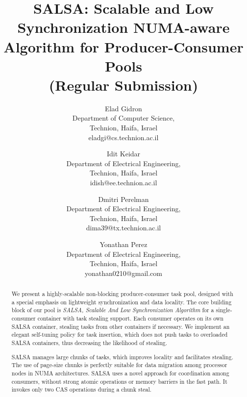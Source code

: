 \documentclass[11pt]{article}
\theoremstyle{plain}
\begin{document}
\begin{titlepage}

\title{SALSA: Scalable and Low Synchronization NUMA-aware Algorithm for Producer-Consumer Pools \\
       {\Large (Regular Submission)}}

\author{Elad Gidron \\
   Department of Computer Science,\\Technion, Haifa, Israel\\
   eladgi@cs.technion.ac.il \\
   \and
   Idit Keidar \\
   Department of Electrical Engineering,\\Technion, Haifa, Israel\\
   idish@ee.technion.ac.il \\
   \and
   Dmitri Perelman \\
   Department of Electrical Engineering,\\Technion, Haifa, Israel\\
   dima39@tx.technion.ac.il \\
   \and
   Yonathan Perez \\
   Department of Electrical Engineering,\\Technion, Haifa, Israel\\
   yonathan0210@gmail.com
   } 

\date{}

\maketitle \thispagestyle{empty}

\begin{abstract}
We present a highly-scalable non-blocking producer-consumer task pool, designed with a special emphasis on lightweight synchronization and data locality.
The core building block of our pool is \emph{SALSA, Scalable And Low Synchronization Algorithm} for a single-consumer container with task stealing support. Each consumer operates on its own SALSA container, stealing tasks from other containers if necessary. We implement an elegant self-tuning policy for task insertion, which does not push tasks to overloaded SALSA containers, thus decreasing the likelihood of stealing. 

SALSA manages large chunks of tasks, which improves locality and facilitates stealing. The use of page-size chunks is perfectly suitable for data migration among processor nodes in NUMA architectures. 
SALSA uses a novel approach for coordination among consumers, without strong atomic operations or memory barriers in the fast path. It invokes only two CAS operations during a chunk steal. 


\end{abstract}
\end{titlepage}
\end{document}
